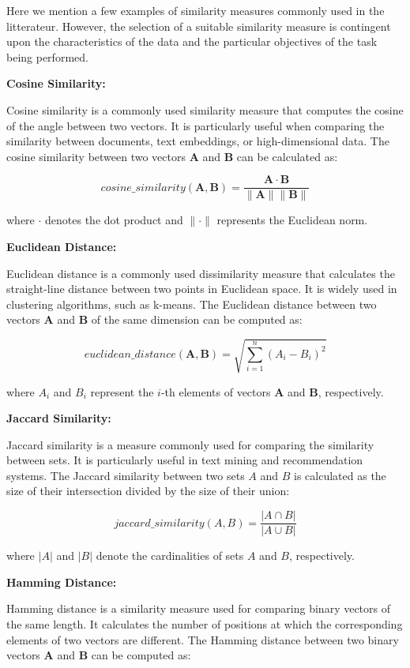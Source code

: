 \documentclass[a4paper,12pt]{article}
\begin{document}
Here we mention a few examples of similarity measures commonly used in the litterateur. However, the selection of a suitable similarity measure is contingent upon the characteristics of the data and the particular objectives of the task being performed.


\textbf{Cosine Similarity:}

Cosine similarity is a commonly used similarity measure that computes the cosine of the angle between two vectors. It is particularly useful when comparing the similarity between documents, text embeddings, or high-dimensional data. The cosine similarity between two vectors $\mathbf{A}$ and $\mathbf{B}$ can be calculated as:

$$cosine\_similarity(\mathbf{A}, \mathbf{B}) = \frac{\mathbf{A} \cdot \mathbf{B}}{\|\mathbf{A}\| \|\mathbf{B}\|}$$

where $\cdot$ denotes the dot product and $\|\cdot\|$ represents the Euclidean norm.

\textbf{Euclidean Distance:}

Euclidean distance is a commonly used dissimilarity measure that calculates the straight-line distance between two points in Euclidean space. It is widely used in clustering algorithms, such as k-means. The Euclidean distance between two vectors $\mathbf{A}$ and $\mathbf{B}$ of the same dimension can be computed as:

$$
euclidean\_distance(\mathbf{A}, \mathbf{B}) = \sqrt{\sum_{i=1}^{n} (A_i - B_i)^2}
$$

where $A_i$ and $B_i$ represent the $i$-th elements of vectors $\mathbf{A}$ and $\mathbf{B}$, respectively.

\textbf{Jaccard Similarity:}

Jaccard similarity \cite{jaccard} is a measure commonly used for comparing the similarity between sets. It is particularly useful in text mining and recommendation systems. The Jaccard similarity between two sets $A$ and $B$ is calculated as the size of their intersection divided by the size of their union:

$$
jaccard\_similarity(A, B) = \frac{|A \cap B|}{|A \cup B|}
$$

where $|A|$ and $|B|$ denote the cardinalities of sets $A$ and $B$, respectively.

\textbf{Hamming Distance:}

Hamming distance \cite{hamming} is a similarity measure used for comparing binary vectors of the same length. It calculates the number of positions at which the corresponding elements of two vectors are different. The Hamming distance between two binary vectors $\mathbf{A}$ and $\mathbf{B}$ can be computed as:
\end{document}
